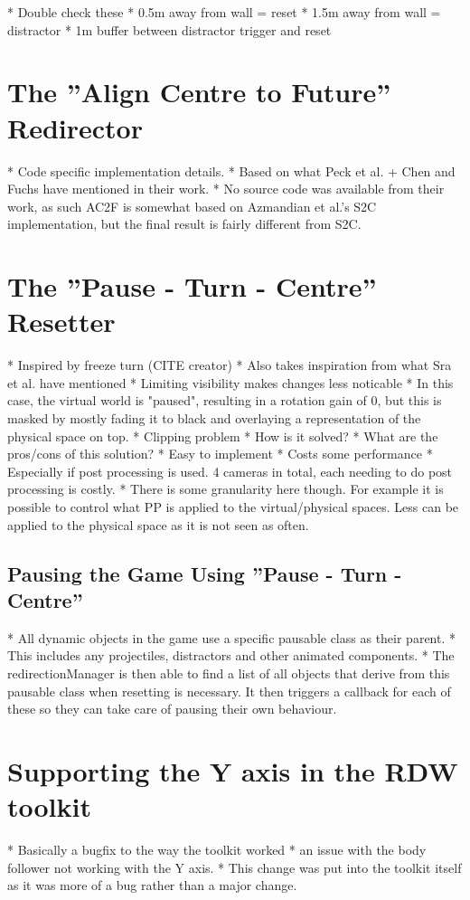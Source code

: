 * Double check these
* 0.5m away from wall = reset
* 1.5m away from wall = distractor
* 1m buffer between distractor trigger and reset

\section{The ''Align Centre to Future'' Redirector}
* Code specific implementation details. 
* Based on what Peck et al. + Chen and Fuchs have mentioned in their work. 
   * No source code was available from their work, as such AC2F is somewhat based on Azmandian et al.'s S2C implementation, but the final result is fairly different from S2C.

\section{The ''Pause - Turn - Centre'' Resetter}
* Inspired by freeze turn (CITE creator)
* Also takes inspiration from what Sra et al. have mentioned
   * Limiting visibility makes changes less noticable
   * In this case, the virtual world is "paused", resulting in a rotation gain of 0, but this is masked by mostly fading it to black and overlaying a representation of the physical space on top. 
* Clipping problem
   * How is it solved?
   * What are the pros/cons of this solution?
      * Easy to implement
      * Costs some performance
         * Especially if post processing is used. 4 cameras in total, each needing to do post processing is costly.
            * There is some granularity here though. For example it is possible to control what PP is applied to the virtual/physical spaces. Less can be applied to the physical space as it is not seen as often.

\subsection{Pausing the Game Using ''Pause - Turn - Centre''}
* All dynamic objects in the game use a specific pausable class as their parent. 
   * This includes any projectiles, distractors and other animated components.
* The redirectionManager is then able to find a list of all objects that derive from this pausable class when resetting is necessary. It then triggers a callback for each of these so they can take care of pausing their own behaviour. 

\section{Supporting the Y axis in the RDW toolkit}
   * Basically a bugfix to the way the toolkit worked
   * an issue with the body follower not working with the Y axis. 
   * This change was put into the toolkit itself as it was more of a bug rather than a major change.

